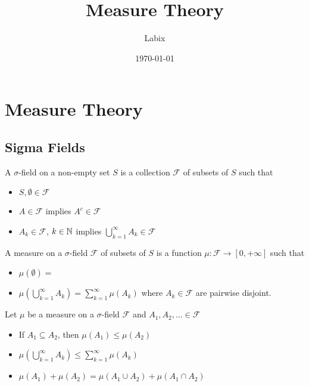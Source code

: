 \documentclass[a4paper]{article}
\title{Measure Theory}
\author{Labix}
\date{\today}
\begin{document}
\maketitle
\begin{abstract}
\end{abstract}
\pagebreak
\tableofcontents
\pagebreak

\section{Measure Theory}
\subsection{Sigma Fields}
\begin{defn} A $\sigma$-field on a non-empty set $S$ is a collection $\mathcal{F}$ of subsets of $S$ such that
\begin{itemize}
\item $S,\emptyset\in\mathcal{F}$
\item $A\in\mathcal{F}$ implies $A^c\in\mathcal{F}$
\item $A_k\in\mathcal{F}$, $k\in\mathbb{N}$ implies $\bigcup_{k=1}^\infty A_k\in\mathcal{F}$
\end{itemize}
\end{defn}

\begin{defn}[Measure] A measure on a $\sigma$-field $\mathcal{F}$ of subsets of $S$ is a function $\mu:\mathcal{F}\to[0,+\infty]$ such that 
\begin{itemize}
\item $\mu(\emptyset)=$
\item $\mu\left(\bigcup_{k=1}^\infty A_k\right)=\sum_{k=1}^\infty\mu\left(A_k\right)$ where $A_k\in\mathcal{F}$ are pairwise disjoint. 
\end{itemize}
\end{defn}

\begin{prp} Let $\mu$ be a measure on a $\sigma$-field $\mathcal{F}$ and $A_1,A_2,\dots\in\mathcal{F}$
\begin{itemize}
\item If $A_1\subseteq A_2$, then $\mu(A_1)\leq\mu(A_2)$
\item $\mu(\bigcup_{k=1}^\infty A_k)\leq\sum_{k=1}^\infty\mu(A_k)$
\item $\mu(A_1)+\mu(A_2)=\mu(A_1\cup A_2)+\mu(A_1\cap A_2)$
\end{itemize}
\end{prp}
\end{document}

